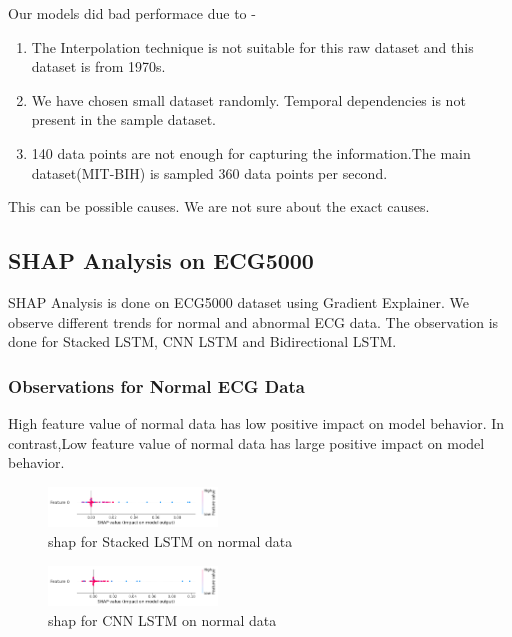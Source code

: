 \documentclass[nonacm,sigconf]{acmart}
\begin{document}

Our models did bad performace due to -
\begin{enumerate}
    \item The Interpolation technique is not suitable for this raw dataset and this dataset is from 1970s.
\item We have chosen small dataset randomly. Temporal dependencies is not present in the sample dataset.
\item 140 data points are not enough for capturing the information.The main dataset(MIT-BIH) is sampled 360 data points per second. 
\end{enumerate}
This can be  possible causes. We are not sure about the exact causes. 
\subsection{SHAP Analysis on ECG5000}
SHAP Analysis is done on ECG5000 dataset using Gradient Explainer. We observe different trends for normal and abnormal ECG data. The observation is done for Stacked LSTM, CNN LSTM and Bidirectional LSTM. 
\subsubsection{\textbf{Observations for Normal ECG Data}} High feature value of  normal data has low positive impact on model behavior. In contrast,Low feature value of  normal data has large positive impact on model behavior.

\begin{figure}
        \centering
        \includegraphics[width=0.4\textwidth]{shap/pos1.png}
        \caption{shap for Stacked LSTM on normal data}
        \label{fig:image1}
    \end{figure}%

\begin{figure}
        \centering
        \includegraphics[width=0.4\textwidth]{shap/pos3.png}
        \caption{shap for CNN LSTM on normal data}
        \label{fig:image1}
    \end{figure}%
\end{document}
